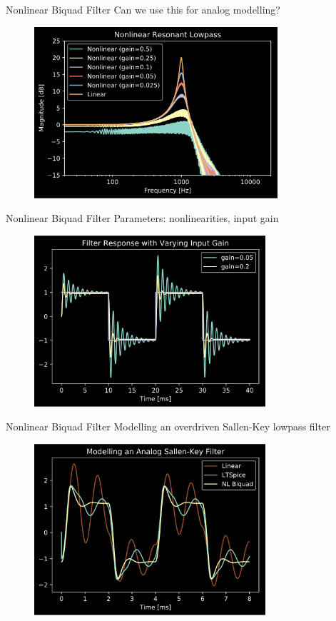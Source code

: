\begin{frame}{Nonlinear Biquad Filter}
    Can we use this for analog modelling?
    \begin{figure}
        \includegraphics[height=2.5in]{../NonlinearBiquad/Pics/NL-LPF.png}
    \end{figure}
\end{frame}

\begin{frame}{Nonlinear Biquad Filter}
    Parameters: nonlinearities, input gain
    \begin{figure}
        \includegraphics[height=2.5in]{../NonlinearBiquad/Pics/50-Hz_Response.png}
    \end{figure}
\end{frame}

\begin{frame}{Nonlinear Biquad Filter}
    Modelling an overdriven Sallen-Key lowpass filter
    \begin{figure}
        \includegraphics[height=2.5in]{../NonlinearBiquad/Pics/Spice-Compare.png}
    \end{figure}
\end{frame}
